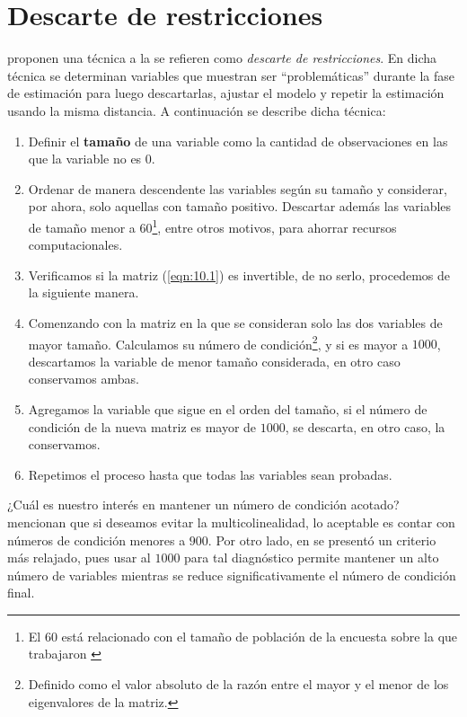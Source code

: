 \documentclass[a4paper,twoside,openright,12pt]{book}
\theoremstyle{definition}
\newcommand\pref[1]{(\ref{#1})}
\numberwithin{equation}{chapter}
\numberwithin{figure}{chapter}
\numberwithin{table}{chapter}
\numberwithin{theorem}{chapter}
\numberwithin{lemma}{chapter}
\begin{document}
\section{Descarte de restricciones}\label{sec:3.3}
\cite{CIS-528372} proponen una técnica a la se refieren como \textsl{descarte de restricciones}. En dicha técnica se determinan variables que muestran ser ``problemáticas'' durante la fase de estimación para luego descartarlas, ajustar el modelo y repetir la estimación usando la misma distancia. A continuación se describe dicha técnica:
\begin{enumerate}
	\item Definir el \textbf{tamaño} de una variable como la cantidad de observaciones en las que la variable no es $0$.
	\item Ordenar de manera descendente las variables según su tamaño y considerar, por ahora, solo aquellas con tamaño positivo. Descartar además las variables de tamaño menor a $60$\footnote{El $60$ está relacionado con el tamaño de población de la encuesta sobre la que trabajaron \citeauthor{CIS-528372}}, entre otros motivos, para ahorrar recursos computacionales.%
	\item Verificamos si la matriz \pref{eqn:10.1} es invertible, de no serlo, procedemos de la siguiente manera.
	\item\label{paso4} Comenzando con la matriz en la que se consideran solo las dos variables de mayor tamaño. Calculamos su número de condición\footnote{Definido como el valor absoluto de la razón entre el mayor y el menor de los eigenvalores de la matriz.}, y si es mayor a $1000$, descartamos la variable de menor tamaño considerada, en otro caso conservamos ambas.
	\item Agregamos la variable que sigue en el orden del tamaño, si el número de condición de la nueva matriz es mayor de $1000$, se descarta, en otro caso, la conservamos.\label{paso5}
	\item Repetimos el proceso hasta que todas las variables sean probadas.
\end{enumerate}%
¿Cuál es nuestro interés en mantener un número de condición acotado? \cite{CIS-167308} mencionan que si deseamos evitar la multicolinealidad, lo aceptable es contar con números de condición menores a $900$. Por otro lado, en \cite{pizer} se presentó un criterio más relajado, pues usar al $1000$ para tal diagnóstico permite mantener un alto número de variables mientras se reduce significativamente el número de condición final.    
\end{document}
